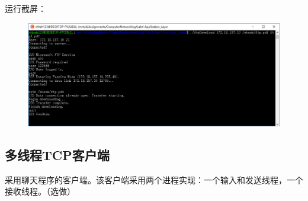 \documentclass[logo,reportComp]{thesis}
\begin{document}
运行截屏：
\begin{figure}[H]
\centering
\includegraphics[width=0.8\linewidth]{fig/ftp-download.PNG}
\end{figure}

\subsection{多线程TCP客户端}
采用聊天程序的客户端。该客户端采用两个进程实现：一个输入和发送线程，一个接收线程。（选做）
\end{document}
